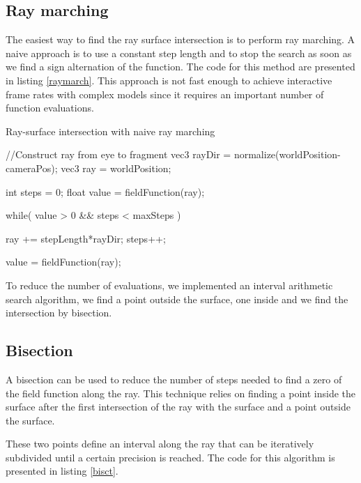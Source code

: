 \documentclass[annual]{acmsiggraph}
\begin{document}
\subsection{Ray marching}

The easiest way to find the ray surface intersection is to perform ray marching. A naive approach is to use a constant step length and to stop the search as soon as we find a sign alternation of the function. The code for this method are presented in listing \ref{raymarch}. This approach is not fast enough to achieve interactive frame rates with complex models since it requires an important number of function evaluations.

\begin{algorithm}                      %
\caption{Ray-surface intersection with naive ray marching}          %
\label{raymarch}                           %
\begin{minipage}{0.9\textwidth}%
\CPP
//Construct ray from eye to fragment
vec3 rayDir = normalize(worldPosition-cameraPos);
vec3 ray = worldPosition;

int steps = 0;	
float value = fieldFunction(ray);

while( value > 0 && steps < maxSteps ){
	ray += stepLength*rayDir;
	steps++;
	
	value = fieldFunction(ray);
}

\END\PROGb{}

\end{minipage}%
\end{algorithm}

To reduce the number of evaluations, we implemented an interval arithmetic search algorithm, we find a point outside the surface, one inside and we find the intersection by bisection. 

\subsection{Bisection}
\label{bisectsec}
A bisection can be used to reduce the number of steps needed to find a zero of the field function along the ray.
This technique relies on finding a point inside the surface after the first intersection of the ray with the surface and a point outside the surface.

These two points define an interval along the ray that can be iteratively subdivided until a certain precision is reached. The code for this algorithm is presented in listing \ref{bisct}.
\end{document}
